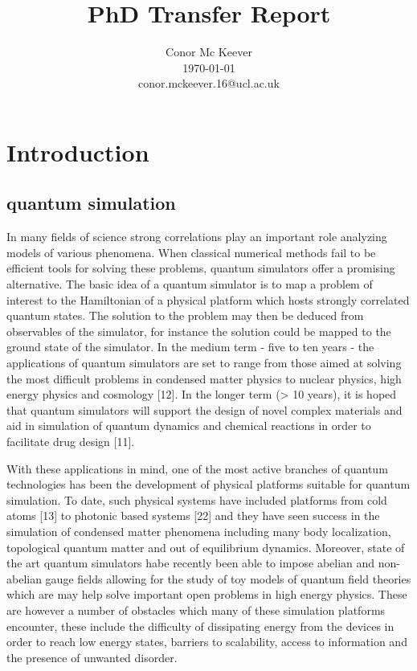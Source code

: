 \documentclass[10pt,twocolumn]{article}
\begin{document}
\title{PhD Transfer Report}

\author{Conor Mc Keever \\
\today\\
conor.mckeever.16@ucl.ac.uk\\
}

\maketitle
\thispagestyle{empty}
\tableofcontents
\section{Introduction}
\subsection{quantum simulation}
In many fields of science strong correlations play an important role analyzing models of various phenomena. When classical numerical methods fail to be efficient tools for solving these problems, quantum simulators offer a promising alternative. The basic idea of a quantum simulator is to map a problem of interest to the Hamiltonian of a physical platform which hosts strongly correlated quantum states. The solution to the problem may then be deduced from observables of the simulator, for instance the solution could be mapped to the ground state of the simulator. In the medium term - five to ten years - the applications of quantum simulators are set to range from those aimed at solving the most difficult problems in condensed matter physics to nuclear physics, high energy physics and cosmology [12]. In the longer term (> 10 years), it is hoped that quantum simulators will support the design of novel complex materials and aid in simulation of quantum dynamics and chemical reactions in order to facilitate drug design [11].

With these applications in mind, one of the most active branches of quantum technologies has been the development of physical platforms suitable for quantum simulation. To date, such physical systems have included platforms from cold atoms [13] to photonic based systems [22] and they have seen success in the simulation of condensed matter phenomena including many body localization, topological quantum matter and out  of equilibrium dynamics. Moreover, state of the art quantum simulators habe recently been able to impose abelian and non-abelian gauge fields allowing for the study of toy models of quantum field theories which are may help solve important open problems in high energy physics. These are however a number of obstacles which many of these simulation platforms encounter, these include the difficulty of dissipating energy from the devices in order to reach low energy states, barriers to scalability, access to information and the presence of unwanted disorder. 
\end{document}
